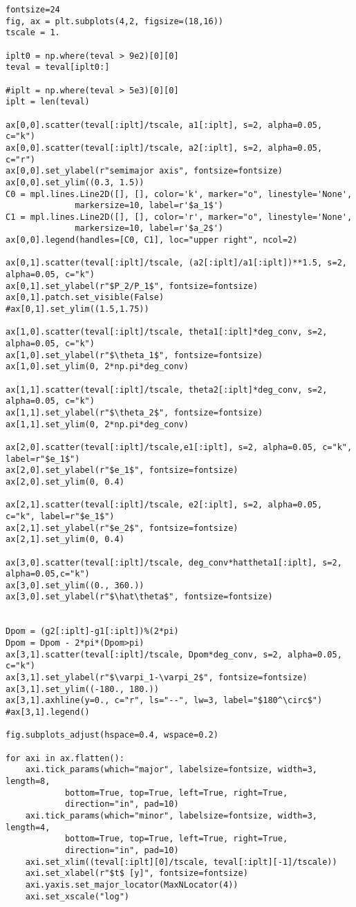 \documentclass[11pt]{article}
\begin{document}
\begin{verbatim}
fontsize=24
fig, ax = plt.subplots(4,2, figsize=(18,16))
tscale = 1.

iplt0 = np.where(teval > 9e2)[0][0]
teval = teval[iplt0:]

#iplt = np.where(teval > 5e3)[0][0]
iplt = len(teval)

ax[0,0].scatter(teval[:iplt]/tscale, a1[:iplt], s=2, alpha=0.05, c="k")
ax[0,0].scatter(teval[:iplt]/tscale, a2[:iplt], s=2, alpha=0.05, c="r")
ax[0,0].set_ylabel(r"semimajor axis", fontsize=fontsize)
ax[0,0].set_ylim((0.3, 1.5))
C0 = mpl.lines.Line2D([], [], color='k', marker="o", linestyle='None',
		      markersize=10, label=r'$a_1$')
C1 = mpl.lines.Line2D([], [], color='r', marker="o", linestyle='None',
		      markersize=10, label=r'$a_2$')
ax[0,0].legend(handles=[C0, C1], loc="upper right", ncol=2)

ax[0,1].scatter(teval[:iplt]/tscale, (a2[:iplt]/a1[:iplt])**1.5, s=2, alpha=0.05, c="k")
ax[0,1].set_ylabel(r"$P_2/P_1$", fontsize=fontsize)
ax[0,1].patch.set_visible(False)
#ax[0,1].set_ylim((1.5,1.75))

ax[1,0].scatter(teval[:iplt]/tscale, theta1[:iplt]*deg_conv, s=2, alpha=0.05, c="k")
ax[1,0].set_ylabel(r"$\theta_1$", fontsize=fontsize)
ax[1,0].set_ylim(0, 2*np.pi*deg_conv)

ax[1,1].scatter(teval[:iplt]/tscale, theta2[:iplt]*deg_conv, s=2, alpha=0.05, c="k")
ax[1,1].set_ylabel(r"$\theta_2$", fontsize=fontsize)
ax[1,1].set_ylim(0, 2*np.pi*deg_conv)

ax[2,0].scatter(teval[:iplt]/tscale,e1[:iplt], s=2, alpha=0.05, c="k", label=r"$e_1$")
ax[2,0].set_ylabel(r"$e_1$", fontsize=fontsize)
ax[2,0].set_ylim(0, 0.4)

ax[2,1].scatter(teval[:iplt]/tscale, e2[:iplt], s=2, alpha=0.05, c="k", label=r"$e_1$")
ax[2,1].set_ylabel(r"$e_2$", fontsize=fontsize)
ax[2,1].set_ylim(0, 0.4)

ax[3,0].scatter(teval[:iplt]/tscale, deg_conv*hattheta1[:iplt], s=2, alpha=0.05,c="k")
ax[3,0].set_ylim((0., 360.))
ax[3,0].set_ylabel(r"$\hat\theta$", fontsize=fontsize)


Dpom = (g2[:iplt]-g1[:iplt])%(2*pi)
Dpom = Dpom - 2*pi*(Dpom>pi)
ax[3,1].scatter(teval[:iplt]/tscale, Dpom*deg_conv, s=2, alpha=0.05, c="k")
ax[3,1].set_ylabel(r"$\varpi_1-\varpi_2$", fontsize=fontsize)
ax[3,1].set_ylim((-180., 180.))
ax[3,1].axhline(y=0., c="r", ls="--", lw=3, label="$180^\circ$")
#ax[3,1].legend()

fig.subplots_adjust(hspace=0.4, wspace=0.2)

for axi in ax.flatten():
    axi.tick_params(which="major", labelsize=fontsize, width=3, length=8,
		    bottom=True, top=True, left=True, right=True,
		    direction="in", pad=10)
    axi.tick_params(which="minor", labelsize=fontsize, width=3, length=4,
		    bottom=True, top=True, left=True, right=True,
		    direction="in", pad=10)
    axi.set_xlim((teval[:iplt][0]/tscale, teval[:iplt][-1]/tscale))
    axi.set_xlabel(r"$t$ [y]", fontsize=fontsize)
    axi.yaxis.set_major_locator(MaxNLocator(4))
    axi.set_xscale("log")



\end{verbatim}
\end{document}
